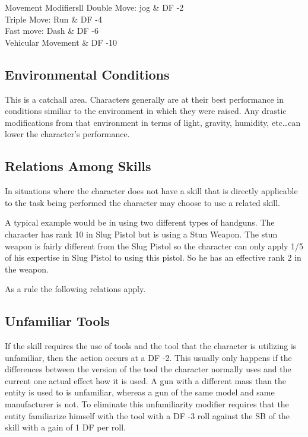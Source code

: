 \begin{stable}{Movement Modifiers}{ll}
	Double Move: jog							  & DF -2 \\
	Triple Move: Run							  & DF -4 \\
	Fast move: Dash							 & DF -6\\
	Vehicular Movement							& DF -10 \\ 
\end{stable}

\subsection{Environmental Conditions}

This is a catchall area. Characters generally are at their best 
performance in conditions similiar to the environment in which they 
were raised. Any drastic modifications from that environment in 
terms of light, gravity, humidity, etc\dots can lower the character's 
performance.



\subsection{Relations Among Skills}

In situations where the character does not have a skill that
is directly applicable to the task being performed the character 
may choose to use a related skill.

A typical example would be in using two different types of handguns. The
character has rank 10 in Slug Pistol but is using a Stun Weapon. The stun
weapon is fairly different from the Slug Pistol so the character can only
apply 1/5 of his expertise in Slug Pistol to using this pistol. So he has
an effective rank 2 in the weapon.

As a rule the following relations apply.


\subsection{Unfamiliar Tools}

If the skill requires the use of tools and the tool that the character is
utilizing is unfamiliar, then the action occurs at a DF -2. This usually
only happens if the differences between the version of the tool the
character normally uses and the current one actual effect how it is
used. A gun with a different mass than the entity is used to is
unfamiliar, whereas a gun of the same model and same manufacturer is
not. To eliminate this unfamiliarity modifier requires that the entity
familiarize himself with the tool with a DF -3 roll against the SB of 
the skill with a gain of 1 DF per roll. 

